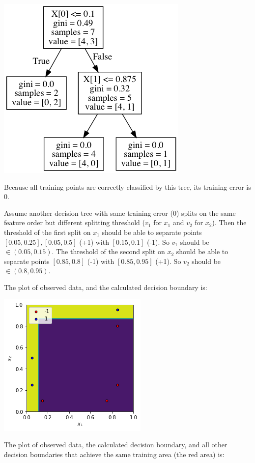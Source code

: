 \documentclass[paper=letter, fontsize=12pt]{article}
\begin{document}
\begin{enumerate}[label=(\alph*)]
	\includegraphics[scale=0.5]{q1b_tree.png}
	
	Because all training points are correctly classified by this tree, its training error is 0.
	
	Assume another decision tree with same training error (0) splits on the same feature order but different splitting threshold ($v_1$ for $x_1$ and $v_2$ for $x_2$). Then the threshold of the first split on $x_1$ should be able to separate points $[0.05, 0.25], [0.05, 0.5]$ (+1) with $[0.15, 0.1]$ (-1). So $v_1$ should be $\in (0.05, 0.15)$. The threshold of the second split on $x_2$ should be able to separate points $[0.85, 0.8]$ (-1) with $[0.85, 0.95]$ (+1). So $v_2$ should be $\in (0.8, 0.95)$.
	
	The plot of observed data, and the calculated decision boundary is:
	
	\includegraphics[scale=0.6]{q1b1.png}
	
	The plot of observed data, the calculated decision boundary, and all other decision boundaries that achieve the same training area (the red area) is:
	

\end{enumerate}
\end{document}
